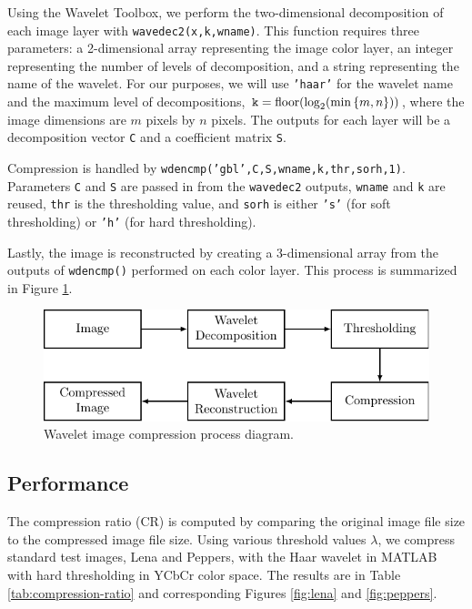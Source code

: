 \documentclass[12pt]{article}
\DeclareMathOperator{\floor}{floor}
\theoremstyle{definition}
\begin{document}
  Using the Wavelet Toolbox, we perform the two-dimensional decomposition of each image layer with \texttt{wavedec2(x,k,wname)}. This function requires three parameters: a 2-dimensional array representing the image color layer, an integer representing the number of levels of decomposition, and a string representing the name of the wavelet. For our purposes, we will use \texttt{'haar'} for the wavelet name and the maximum level of decompositions, \(\texttt{k} = \floor(\log_2(\min\qty{m,n}))\), where the image dimensions are \(m\) pixels by \(n\) pixels. The outputs for each layer will be a decomposition vector \texttt{C} and a coefficient matrix \texttt{S}.

  Compression is handled by \texttt{wdencmp('gbl',C,S,wname,k,thr,sorh,1)}. Parameters \texttt{C} and \texttt{S} are passed in from the \texttt{wavedec2} outputs, \texttt{wname} and \texttt{k} are reused, \texttt{thr} is the thresholding value, and \texttt{sorh} is either \texttt{'s'} (for soft thresholding) or \texttt{'h'} (for hard thresholding).

  Lastly, the image is reconstructed by creating a 3-dimensional array from the outputs of \texttt{wdencmp()} performed on each color layer. This process is summarized in Figure \ref{fig:process-diagram}.

  \begin{figure}
    \centering
    \includegraphics{figs/fig-process.pdf}
    \caption{Wavelet image compression process diagram.}
    \label{fig:process-diagram}
  \end{figure}

  \subsection{Performance}
  The compression ratio (CR) is computed by comparing the original image file size to the compressed image file size. Using various threshold values \(\lambda\), we compress standard test images, Lena and Peppers, with the Haar wavelet in MATLAB with hard thresholding in YCbCr color space. The results are in Table \ref{tab:compression-ratio} and corresponding Figures
  \ref{fig:lena} and \ref{fig:peppers}.
\end{document}
